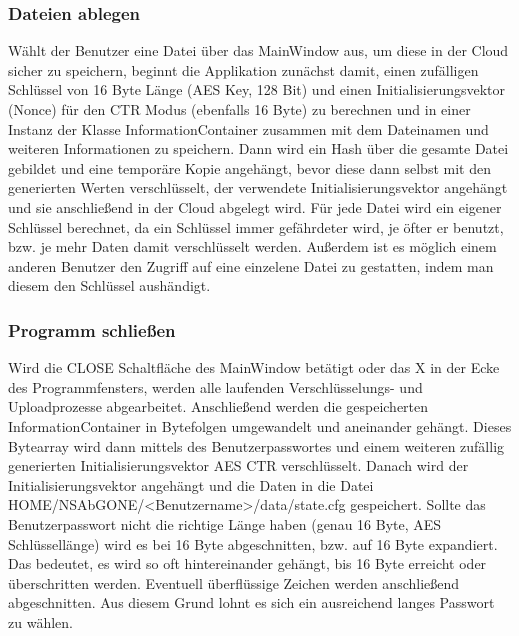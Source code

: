 \documentclass[13pt,a4paper,bibliography=totocnumbered,listof=totocnumbered]{scrartcl}
\begin{document}
\subsubsection{Dateien ablegen}
Wählt der Benutzer eine Datei über das MainWindow aus, um diese in der Cloud sicher zu speichern, beginnt die Applikation zunächst damit, einen zufälligen Schlüssel von 16 Byte Länge (AES Key, 128 Bit) und einen Initialisierungsvektor (Nonce) für den CTR Modus (ebenfalls 16 Byte) zu berechnen und in einer Instanz der Klasse InformationContainer zusammen mit dem Dateinamen und weiteren Informationen zu speichern. Dann wird ein Hash über die gesamte Datei gebildet und eine temporäre Kopie angehängt, bevor diese dann selbst mit den generierten Werten verschlüsselt, der verwendete Initialisierungsvektor angehängt und sie anschließend in der Cloud abgelegt wird. Für jede Datei wird ein eigener Schlüssel berechnet, da ein Schlüssel immer gefährdeter wird, je öfter er benutzt, bzw. je mehr Daten damit verschlüsselt werden. Außerdem ist es möglich einem anderen Benutzer den Zugriff auf eine einzelene Datei zu gestatten, indem man diesem den Schlüssel aushändigt. 
\subsubsection{Programm schließen}
Wird die CLOSE Schaltfläche des MainWindow betätigt oder das X in der Ecke des Programmfensters, werden alle laufenden Verschlüsselungs- und Uploadprozesse abgearbeitet. Anschließend werden die gespeicherten InformationContainer in Bytefolgen umgewandelt und aneinander gehängt. Dieses Bytearray wird dann mittels des Benutzerpasswortes und einem weiteren zufällig generierten Initialisierungsvektor AES CTR verschlüsselt. Danach wird der Initialisierungsvektor angehängt und die Daten in die Datei HOME/NSAbGONE/\textless Benutzername\textgreater/data/state.cfg gespeichert. Sollte das Benutzerpasswort nicht die richtige Länge haben (genau 16 Byte, AES Schlüssellänge) wird es bei 16 Byte abgeschnitten, bzw. auf 16 Byte expandiert. Das bedeutet, es wird so oft hintereinander gehängt, bis 16 Byte erreicht oder überschritten werden. Eventuell überflüssige Zeichen werden anschließend abgeschnitten. Aus diesem Grund lohnt es sich ein ausreichend langes Passwort zu wählen.
\end{document}
